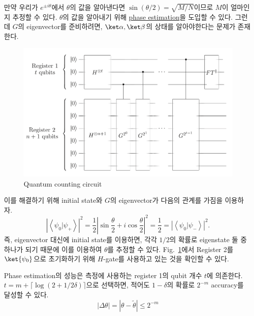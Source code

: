 만약 우리가 $e^{\pm i \theta}$에서 $\theta$의 값을 알아낸다면 $\sin(\theta/2) = \sqrt{M/N}$이므로 $M$이 얼마인지 추정할 수 있다. $\theta$의 값을 알아내기 위해 \hyperref[sec:QPE]{phase estimation}을 도입할 수 있다. 그런데 $G$의 eigenvector를 준비하려면, $\ket \alpha, \ket \beta$의 상태를 알아야한다는 문제가 존재한다.

\begin{figure}[H]
  \centering
  \includegraphics[width=0.6\linewidth]{figures/quantum_counting.png}
  \caption{Quantum counting circuit}
  \label{fig:amplitude-estimation}
\end{figure}


이를 해결하기 위해 initial state와 $G$의 eigenvector가 다음의 관계를 가짐을 이용하자.
\begin{equation*}
  \left|\left\langle\psi_0 | \psi_{+}\right\rangle\right|^2=\frac{1}{2}\left|\sin \frac{\theta}{2}+i \cos \frac{\theta}{2}\right|^2=\frac{1}{2}=\left|\left\langle\psi_0 | \psi_{-}\right\rangle\right|^2 .
\end{equation*}
즉, eigenvector 대신에 initial state를 이용하면, 각각 $1/2$의 확률로 eigenstate 둘 중 하나가 되기 때문에 이를 이용하여 $\theta$를 추정할 수 있다. Fig.~\ref{fig:amplitude-estimation}에서 Register 2를 $\ket{\psi_0}$으로 초기화하기 위해 $H$-gate를 사용하고 있는 것을 확인할 수 있다.

\vspace{1em}

Phase estimation의 성능은 측정에 사용하는 register 1의 qubit 개수 $t$에 의존한다.
$t = m+\lceil\log (2+1 / 2 \delta)\rceil$으로 선택하면, 적어도 $1-\delta$의 확률로 $2^{-m}$ accuracy를 달성할 수 있다. 
\begin{equation*}
  |\Delta \theta| = |\theta - \tilde \theta| \le 2^{-m}
\end{equation*}

